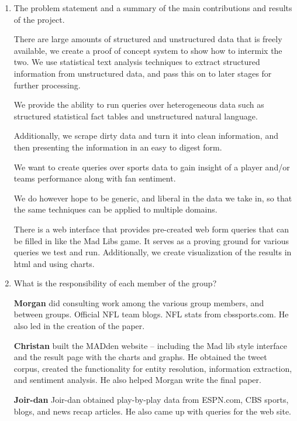 \documentclass[11pt]{article}
\newcommand{\system}{MADden\xspace}
\begin{document}
  \begin{enumerate}
  \item The problem statement and a summary of the main contributions and results of the project.

    There are large amounts of structured and unstructured data that is freely available,
		we create a proof of concept system to show how to intermix the two.
    We use statistical text analysis techniques to extract structured information from unstructured 
		data, and pass this on to later stages for further processing.

    We provide the ability to run queries over heterogeneous data such as structured statistical 
		fact tables and unstructured natural language.

    Additionally, we  scrape dirty data and turn it into clean information, and then presenting 
		the information in an easy to digest form.

    We want to create queries over sports data to gain insight of a player and/or teams
		performance along with fan sentiment.

    We do however hope to be generic, and liberal in the data we take in, so that the same techniques can be applied to multiple domains.

    There is a web interface that provides pre-created web form queries that can be filled in 
		like the Mad Libs game.
    It serves as a proving ground for various queries we test and run.
		Additionally, we create visualization of the results in html and using charts.

  \item What is the responsibility of each member of the group?


   \textbf{Morgan} did consulting work among the various group members, and between groups.
    Official NFL team blogs. NFL stats from cbssports.com. He also led in the creation of the paper.
		
		\textbf{Christan} built the \system website -- including the Mad lib style interface and the 
		result page with the charts and graphs. He obtained the tweet corpus, created the functionality
		for entity resolution, information extraction, and sentiment analysis. He also helped Morgan
		write the final paper.

		\textbf{Joir-dan} Joir-dan obtained play-by-play data from ESPN.com, CBS sports, blogs,
		and news recap articles.
		He also came up with queries for the web site.

  \end{enumerate}
\end{document}
